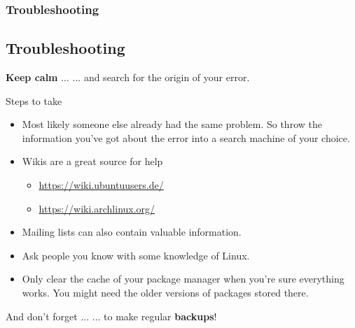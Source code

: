 \begin{frame}
	\frametitle{Troubleshooting}
	\subsection{Troubleshooting}
	
	\begin{exampleblock}{\textbf{Keep calm} ...}
		... and search for the origin of your error.
	\end{exampleblock}

	\vfill

	\begin{block}{Steps to take}
		\begin{itemize}
			\item Most likely someone else already had the same problem. So throw the information you've got about the error into a search machine of your choice.
			\item Wikis are a great source for help
			\begin{itemize}
				\item \url{https://wiki.ubuntuusers.de/}
				\item \url{https://wiki.archlinux.org/}
			\end{itemize}
			\item Mailing lists can also contain valuable information.
			\item Ask people you know with some knowledge of Linux.
			\item Only clear the cache of your package manager when you're sure everything works. You might need the older versions of packages stored there.
		\end{itemize}
	\end{block}

	\vfill

	\begin{alertblock}{And don't forget ...}
		... to make regular \textbf{backups}!
	\end{alertblock}
\end{frame}
